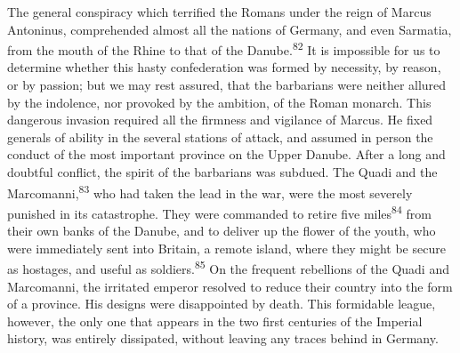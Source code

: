 
The general conspiracy which terrified the Romans under the reign
of Marcus Antoninus, comprehended almost all the nations of
Germany, and even Sarmatia, from the mouth of the Rhine to that
of the Danube.\textsuperscript{82} It is impossible for us to determine whether
this hasty confederation was formed by necessity, by reason, or
by passion; but we may rest assured, that the barbarians were
neither allured by the indolence, nor provoked by the ambition,
of the Roman monarch. This dangerous invasion required all the
firmness and vigilance of Marcus. He fixed generals of ability in
the several stations of attack, and assumed in person the conduct
of the most important province on the Upper Danube. After a long
and doubtful conflict, the spirit of the barbarians was subdued.
The Quadi and the Marcomanni,\textsuperscript{83} who had taken the lead in the
war, were the most severely punished in its catastrophe. They
were commanded to retire five miles\textsuperscript{84} from their own banks of
the Danube, and to deliver up the flower of the youth, who were
immediately sent into Britain, a remote island, where they might
be secure as hostages, and useful as soldiers.\textsuperscript{85} On the frequent
rebellions of the Quadi and Marcomanni, the irritated emperor
resolved to reduce their country into the form of a province. His
designs were disappointed by death. This formidable league,
however, the only one that appears in the two first centuries of
the Imperial history, was entirely dissipated, without leaving
any traces behind in Germany.




